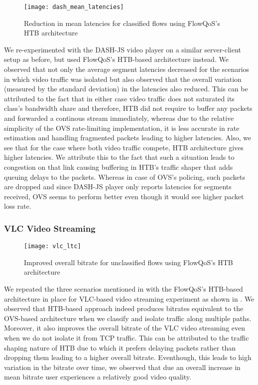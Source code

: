 \begin{figure}[t]
    \texttt{[image: dash\_mean\_latencies]}
    \caption{Reduction in mean latencies for classified flows using FlowQoS's HTB architecture}
    \centering
    \label{fig:dash_mean}
\end{figure}

We re-experimented with the DASH-JS video player on a similar server-client setup as before, but used FlowQoS's HTB-based architecture instead. We observed that not only the average segment latencies decreased for the scenarios in which video traffic was isolated but also observed that the overall variation (measured by the standard deviation) in the latencies also reduced. This can be attributed to the fact that in either case video traffic does not saturated its class's bandwidth share and therefore, HTB did not require to buffer any packets and forwarded a continous stream immediately, whereas due to the relative simplicity of the OVS rate-limiting implementation, it is less accurate in rate estimation and handling fragmented packets leading to higher latencies.
Also, we see that for the case where both video traffic compete, HTB architecture gives higher latencies. We attribute this to the fact that such a situation leads to congestion on that link causing buffering in HTB's traffic shaper that adds queuing delays to the packets. Whereas in case of OVS's policing, such packets are dropped and since DASH-JS player only reports latencies for segments received, OVS seems to perform better even though it would see higher packet loss rate.

\subsubsection{VLC Video Streaming}

\begin{figure}[t]
    \texttt{[image: vlc\_ltc]}
    \caption{Improved overall bitrate for unclassified flows using FlowQoS's HTB architecture}
    \centering
    \label{fig:vlc_ltc}
\end{figure}

We repeated the three scenarios mentioned in  with the FlowQoS's HTB-based architecture in place for VLC-based video streaming experiment as shown in . We observed that HTB-based approach indeed produces bitrates equivalent to the OVS-based architecture when we classify and isolate traffic along multiple paths. Moreover, it also improves the overall bitrate of the VLC video streaming even when we do not isolate it from TCP traffic. This can be attributed to the traffic shaping nature of HTB due to which it prefers delaying packets rather than dropping them leading to a higher overall bitrate. Eventhough, this leads to high variation in the bitrate over time, we observed that due an overall increase in mean bitrate user experiences a relatively good video quality.\\\\